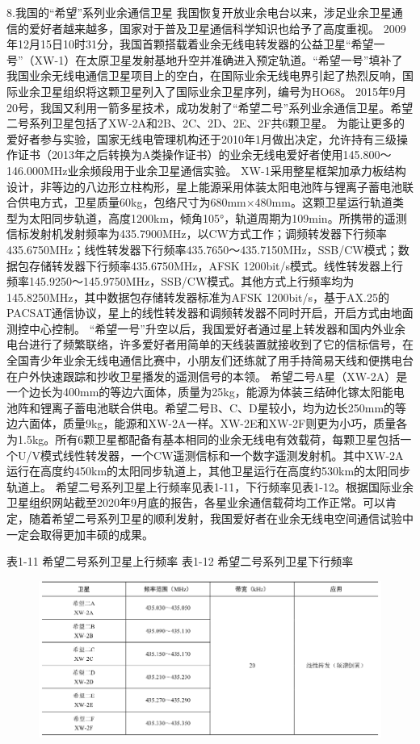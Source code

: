 \documentclass[12pt,UTF8]{ctexbook}
\begin{document}
8.我国的“希望”系列业余通信卫星
我国恢复开放业余电台以来，涉足业余卫星通信的爱好者越来越多，国家对于普及卫星通信科学知识也给予了高度重视。
2009年12月15日10时31分，我国首颗搭载着业余无线电转发器的公益卫星“希望一号”（XW-1）在太原卫星发射基地升空并准确进入预定轨道。“希望一号”填补了我国业余无线电通信卫星项目上的空白，在国际业余无线电界引起了热烈反响，国际业余卫星组织将这颗卫星列入了国际业余卫星序列，编号为HO68。
2015年9月20号，我国又利用一箭多星技术，成功发射了“希望二号”系列业余通信卫星。希望二号系列卫星包括了XW-2A和2B、2C、2D、2E、2F共6颗卫星。
为能让更多的爱好者参与实验，国家无线电管理机构还于2010年1月做出决定，允许持有三级操作证书（2013年之后转换为A类操作证书）的业余无线电爱好者使用145.800～146.000MHz业余频段用于业余卫星通信实验。
XW-1采用整星框架加承力板结构设计，非等边的八边形立柱构形，星上能源采用体装太阳电池阵与锂离子蓄电池联合供电方式，卫星质量60kg，包络尺寸为680mm×480mm。这颗卫星运行轨道类型为太阳同步轨道，高度1200km，倾角105°，轨道周期为109min。所携带的遥测信标发射机发射频率为435.7900MHz，以CW方式工作；调频转发器下行频率435.6750MHz；线性转发器下行频率435.7650～435.7150MHz，SSB/CW模式；数据包存储转发器下行频率435.6750MHz，AFSK 1200bit/s模式。线性转发器上行频率145.9250～145.9750MHz，SSB/CW模式。其他方式上行频率均为145.8250MHz，其中数据包存储转发器标准为AFSK 1200bit/s，基于AX.25的PACSAT通信协议，星上的线性转发器和调频转发器不同时开启，开启方式由地面测控中心控制。
“希望一号”升空以后，我国爱好者通过星上转发器和国内外业余电台进行了频繁联络，许多爱好者用简单的天线装置就接收到了它的信标信号，在全国青少年业余无线电通信比赛中，小朋友们还练就了用手持简易天线和便携电台在户外快速跟踪和抄收卫星播发的遥测信号的本领。
希望二号A星（XW-2A）是一个边长为400mm的等边六面体，质量为25kg，能源为体装三结砷化镓太阳能电池阵和锂离子蓄电池联合供电。希望二号B、C、D星较小，均为边长250mm的等边六面体，质量9kg，能源和XW-2A一样。XW-2E和XW-2F则更为小巧，质量各为1.5kg。所有6颗卫星都配备有基本相同的业余无线电有效载荷，每颗卫星包括一个U/V模式线性转发器，一个CW遥测信标和一个数字遥测发射机。其中XW-2A运行在高度约450km的太阳同步轨道上，其他卫星运行在高度约530km的太阳同步轨道上。
希望二号系列卫星上行频率见表1-11，下行频率见表1-12。根据国际业余卫星组织网站截至2020年9月底的报告，各星业余通信载荷均工作正常。可以肯定，随着希望二号系列卫星的顺利发射，我国爱好者在业余无线电空间通信试验中一定会取得更加丰硕的成果。

表1-11 希望二号系列卫星上行频率
表1-12 希望二号系列卫星下行频率

\begin{figure}[htbp]
	\centering
	\includegraphics[width=0.7\linewidth]{93}
	\caption{}
	\label{fig:1}
\end{figure}
\end{document}
